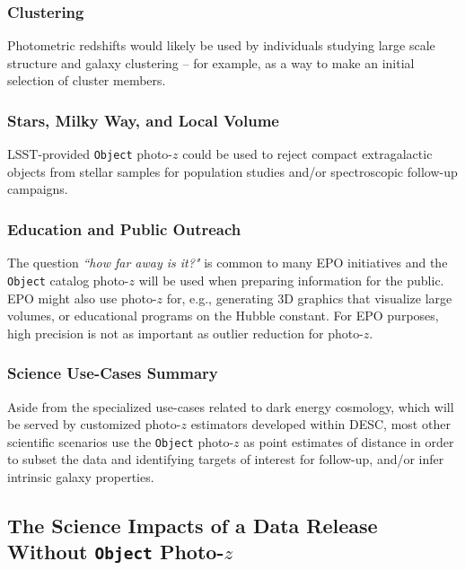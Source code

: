 \documentclass[DM,authoryear,toc]{lsstdoc}
\begin{document}
\subsubsection{Clustering}\label{sssec:use_sci_clust}
Photometric redshifts would likely be used by individuals studying large scale structure and galaxy clustering -- for example, as a way to make an initial selection of cluster members.

\subsubsection{Stars, Milky Way, and Local Volume}\label{sssec:use_sci_smwlv}
LSST-provided {\tt Object} photo-$z$ could be used to reject compact extragalactic objects from stellar samples for population studies and/or spectroscopic follow-up campaigns.

\subsubsection{Education and Public Outreach}\label{sssec:use_sci_epo}
The question {\it ``how far away is it?"} is common to many EPO initiatives and the {\tt Object} catalog photo-$z$ will be used when preparing information for the public.
EPO might also use photo-$z$ for, e.g., generating 3D graphics that visualize large volumes, or educational programs on the Hubble constant.
For EPO purposes, high precision is not as important as outlier reduction for photo-$z$.

\subsubsection{Science Use-Cases Summary}\label{sssec:use_sci_sum}
Aside from the specialized use-cases related to dark energy cosmology, which will be served by customized photo-$z$ estimators developed within DESC, most other scientific scenarios use the {\tt Object} photo-$z$ as point estimates of distance in order to subset the data and identifying targets of interest for follow-up, and/or infer intrinsic galaxy properties.

\subsection{The Science Impacts of a Data Release Without {\tt Object} Photo-$z$}\label{ssec:use_none}
\end{document}

